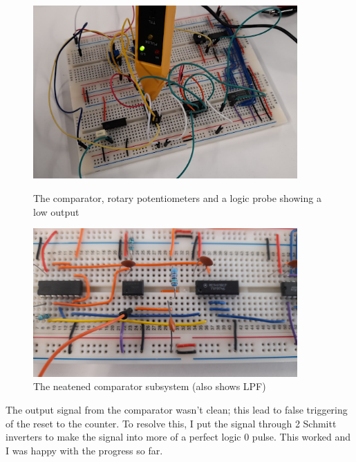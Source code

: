 \begin{figure} [H]
    \centering
    \begin{minipage}[t]{0.45\textwidth}
        \centering
        \includegraphics[width=0.9\textwidth]{images/comparatorTesting3.png}
        \caption{The comparator, rotary potentiometers and a logic probe showing a low output}
        \label{fig:comparatorTesting3}
    \end{minipage}\hfill
    \begin{minipage}[t]{0.45\textwidth}
        \centering
        \includegraphics[width=0.9\textwidth]{images/comparatorNeatened.jpg}
        \caption{The neatened comparator subsystem (also shows LPF)}
        \label{fig:comparatorNeatened}
    \end{minipage}
\end{figure}
\noindent The output signal from the comparator wasn’t clean; this lead to false triggering of the reset to the counter. To resolve this, I put the signal through 2 Schmitt inverters to make the signal into more of a perfect logic 0 pulse. This worked and I was happy with the progress so far.

